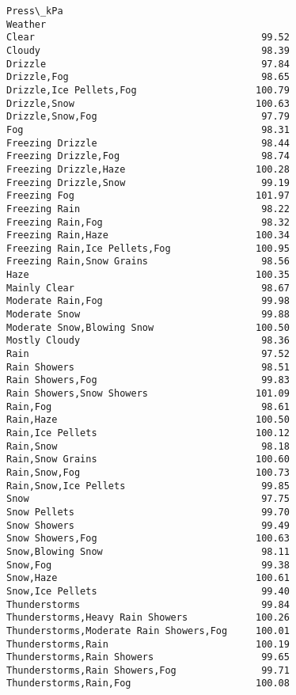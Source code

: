 \documentclass[11pt]{article}
\begin{document}
\begin{tcolorbox}[breakable, size=fbox, boxrule=.5pt, pad at break*=1mm, opacityfill=0]
\begin{Verbatim}[commandchars=\\\{\}]
                                         Press\_kPa
Weather
Clear                                        99.52
Cloudy                                       98.39
Drizzle                                      97.84
Drizzle,Fog                                  98.65
Drizzle,Ice Pellets,Fog                     100.79
Drizzle,Snow                                100.63
Drizzle,Snow,Fog                             97.79
Fog                                          98.31
Freezing Drizzle                             98.44
Freezing Drizzle,Fog                         98.74
Freezing Drizzle,Haze                       100.28
Freezing Drizzle,Snow                        99.19
Freezing Fog                                101.97
Freezing Rain                                98.22
Freezing Rain,Fog                            98.32
Freezing Rain,Haze                          100.34
Freezing Rain,Ice Pellets,Fog               100.95
Freezing Rain,Snow Grains                    98.56
Haze                                        100.35
Mainly Clear                                 98.67
Moderate Rain,Fog                            99.98
Moderate Snow                                99.88
Moderate Snow,Blowing Snow                  100.50
Mostly Cloudy                                98.36
Rain                                         97.52
Rain Showers                                 98.51
Rain Showers,Fog                             99.83
Rain Showers,Snow Showers                   101.09
Rain,Fog                                     98.61
Rain,Haze                                   100.50
Rain,Ice Pellets                            100.12
Rain,Snow                                    98.18
Rain,Snow Grains                            100.60
Rain,Snow,Fog                               100.73
Rain,Snow,Ice Pellets                        99.85
Snow                                         97.75
Snow Pellets                                 99.70
Snow Showers                                 99.49
Snow Showers,Fog                            100.63
Snow,Blowing Snow                            98.11
Snow,Fog                                     99.38
Snow,Haze                                   100.61
Snow,Ice Pellets                             99.40
Thunderstorms                                99.84
Thunderstorms,Heavy Rain Showers            100.26
Thunderstorms,Moderate Rain Showers,Fog     100.01
Thunderstorms,Rain                          100.19
Thunderstorms,Rain Showers                   99.65
Thunderstorms,Rain Showers,Fog               99.71
Thunderstorms,Rain,Fog                      100.08
\end{Verbatim}
\end{tcolorbox}
        
\end{document}
